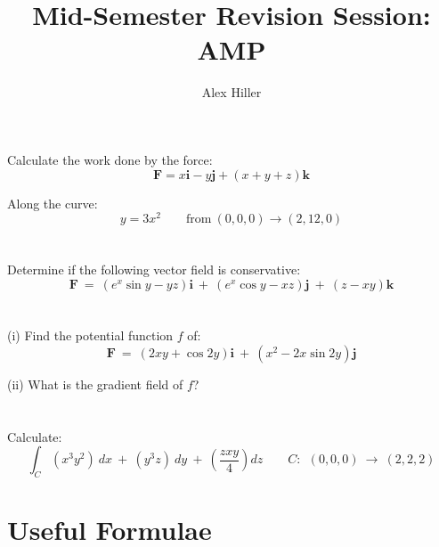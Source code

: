 \documentclass{article}
\author{Alex Hiller}
\title{Mid-Semester Revision Session: AMP}
\begin{document}
% 


\section{}

  Calculate the work done by the force:
  $$ 
    \mathbf{F} = x \mathbf{i} - y \mathbf{j} + (x + y + z) \mathbf{k}     
  $$

  Along the curve:
  $$
    y = 3x^2    \qquad \text{from} \ (0,0,0)  \rightarrow (2,12,0)
  $$

  
\clearpage


\section{}

  Determine if the following vector field is conservative:
  $$
    \mathbf{F} \ = \ (e^x \sin y - y z ) \mathbf{i} \ + \  (e^x \cos y - x z ) \mathbf{j} \ + \  (z - x y)  \mathbf{k}
  $$

\clearpage


\section{}

  (i) Find the potential function $f$ of:
    $$
      \mathbf{F} \ = \ (2xy + \cos 2y) \mathbf{i} \ + \  (x^2 - 2 x \sin 2y) \mathbf{j} 
    $$

  (ii) What is the gradient field of $f$?


\clearpage

\section{}

  Calculate: 
  $$  
    \int_C (x^3y^2) \ dx  \ + \ (y^3 z ) \ dy \ + \ (\frac{zxy}{4}) dz 
    \qquad
    C: \  \ (0,0,0) \ \rightarrow \ (2,2,2)
  $$




\clearpage


\section{Useful Formulae}
\end{document}
